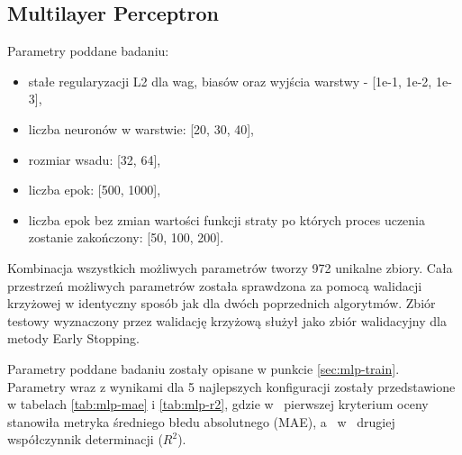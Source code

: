 \subsection{Multilayer Perceptron}\label{sec:mlp-eval}

Parametry poddane badaniu:
\begin{itemize}
    \item stałe regularyzacji L2 dla wag, biasów oraz wyjścia warstwy - [1e-1, 1e-2, 1e-3],
    \item liczba neuronów w warstwie: [20, 30, 40],
    \item rozmiar wsadu: [32, 64],
    \item liczba epok: [500, 1000],
    \item liczba epok bez zmian wartości funkcji straty po których proces uczenia zostanie zakończony: [50, 100, 200].
\end{itemize}

Kombinacja wszystkich możliwych parametrów tworzy 972 unikalne zbiory. Cała przestrzeń możliwych parametrów została sprawdzona za pomocą walidacji krzyżowej w identyczny sposób jak dla dwóch poprzednich algorytmów. Zbiór testowy wyznaczony przez walidację krzyżową służył jako zbiór walidacyjny dla metody Early Stopping.

Parametry poddane badaniu zostały opisane w punkcie \ref{sec:mlp-train}. Parametry wraz z wynikami dla 5 najlepszych konfiguracji zostały przedstawione w tabelach \ref{tab:mlp-mae} i \ref{tab:mlp-r2}, gdzie w~ pierwszej kryterium oceny stanowiła metryka średniego błedu absolutnego (MAE), a~ w~ drugiej współczynnik determinacji ($R^{2}$).

